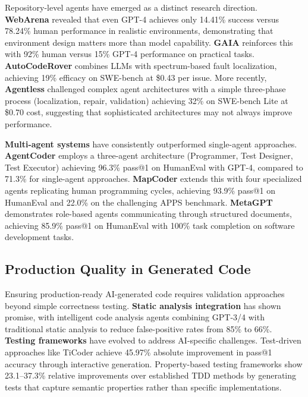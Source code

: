 \documentclass{article}
\begin{document}
Repository-level agents have emerged as a distinct research direction. \textbf{WebArena} \citep{zhou2024webarena} revealed that even GPT-4 achieves only 14.41\% success versus 78.24\% human performance in realistic environments, demonstrating that environment design matters more than model capability. \textbf{GAIA} \citep{mialon2023gaia} reinforces this with 92\% human versus 15\% GPT-4 performance on practical tasks. \textbf{AutoCodeRover} \citep{zhang2024autocoder} combines LLMs with spectrum-based fault localization, achieving 19\% efficacy on SWE-bench at \$0.43 per issue. More recently, \textbf{Agentless} \citep{xia2024agentless} challenged complex agent architectures with a simple three-phase process (localization, repair, validation) achieving 32\% on SWE-bench Lite at \$0.70 cost, suggesting that sophisticated architectures may not always improve performance.

\textbf{Multi-agent systems} have consistently outperformed single-agent approaches. \textbf{AgentCoder} \citep{huang2023agentcoder} employs a three-agent architecture (Programmer, Test Designer, Test Executor) achieving 96.3\% pass@1 on HumanEval with GPT-4, compared to 71.3\% for single-agent approaches. \textbf{MapCoder} \citep{islam2024mapcoder} extends this with four specialized agents replicating human programming cycles, achieving 93.9\% pass@1 on HumanEval and 22.0\% on the challenging APPS benchmark. \textbf{MetaGPT} \citep{hong2023metagpt} demonstrates role-based agents communicating through structured documents, achieving 85.9\% pass@1 on HumanEval with 100\% task completion on software development tasks.

\subsection{Production Quality in Generated Code}

Ensuring production-ready AI-generated code requires validation approaches beyond simple correctness testing. \textbf{Static analysis integration} has shown promise, with intelligent code analysis agents combining GPT-3/4 with traditional static analysis to reduce false-positive rates from 85\% to 66\%. \textbf{Testing frameworks} have evolved to address AI-specific challenges. Test-driven approaches like TiCoder achieve 45.97\% absolute improvement in pass@1 accuracy through interactive generation. Property-based testing frameworks show 23.1--37.3\% relative improvements over established TDD methods by generating tests that capture semantic properties rather than specific implementations.
\end{document}
